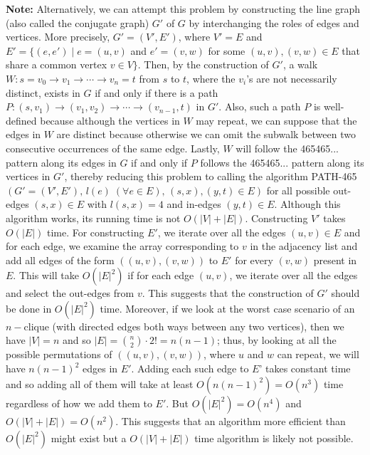 \documentclass[tikz, letterpaper,12pt]{article}
\begin{document}
\textbf{Note:} Alternatively, we can attempt this problem by constructing the line graph (also called the conjugate graph) $G'$ of $G$ by interchanging the roles of edges and vertices. More precisely, ${G'=(V',E')}$, where $V'=E$ and $E'=\{(e,e')\mid e=(u,v)$ and $e'=(v,w)$ for some $(u,v),(v,w)\in E$ that share a common vertex $v\in V\}$. Then, by the construction of $G'$, a walk $W:s=v_0\to v_1\to\cdots\to v_n=t$ from $s$ to $t$, where the $v_i$'s are not necessarily distinct, exists in $G$ if and only if there is a path $P:(s,v_1)\to(v_1,v_2)\to\cdots\to(v_{n-1},t)$ in $G'$. Also, such a path $P$ is well-defined because although the vertices in $W$ may repeat, we can suppose that the edges in $W$ are distinct because otherwise we can omit the subwalk between two consecutive occurrences of the same edge. Lastly, $W$ will follow the 465465... pattern along its edges in $G$ if and only if $P$ follows the 465465... pattern along its vertices in $G'$, thereby reducing this problem to calling the algorithm PATH-465$(G'=(V',E'),\,l(e)\;(\forall e\in E),\,(s, x),(y,t)\in E)$ for all possible out-edges $(s,x)\in E$ with $l(s,x)=4$ and in-edges $(y,t)\in E$. Although this algorithm works, its running time is not $O(|V|+|E|)$. Constructing $V'$ takes $O(|E|)$ time. For constructing $E'$, we iterate over all the edges $(u,v)\in E$ and for each edge, we examine the array corresponding to $v$ in the adjacency list and add all edges of the form $((u,v),(v,w))$ to $E'$ for every $(v,w)$ present in $E$. This will take $O(|E|^2)$ if for each edge $(u,v)$, we iterate over all the edges and select the out-edges from $v$. This suggests that the construction of $G'$ should be done in $O(|E|^2)$ time. Moreover, if we look at the worst case scenario of an $n-$clique (with directed edges both ways between any two vertices), then we have $|V|=n$ and so $|E| = {n \choose 2}\cdot 2! = n(n-1)$; thus, by looking at all the possible permutations of $((u,v),(v,w))$, where $u$ and $w$ can repeat, we will have $n(n-1)^2$ edges in $E'$. Adding each such edge to $E$' takes constant time and so adding all of them will take at least $O(n(n-1)^2)=O(n^3)$ time regardless of how we add them to $E'$. But $O(|E|^2) = O(n^4)$ and $O(|V|+|E|) = O(n^2)$. This suggests that an algorithm more efficient than $O(|E|^2)$ might exist but a $O(|V|+|E|)$ time algorithm is likely not possible.
\end{document}
